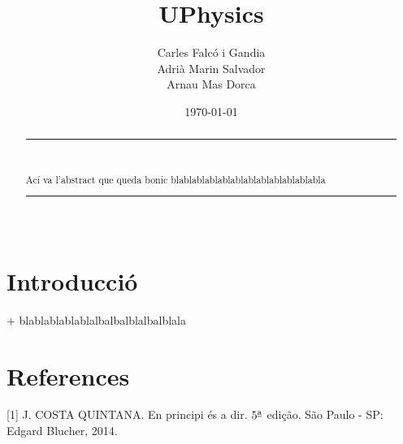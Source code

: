 \documentclass[aps,prl,reprint]{revtex4-1}
\begin{document}
	
	
	\title{UPhysics}
	
	\author{Carles Falcó i Gandia\\Adrià Marin Salvador\\Arnau Mas Dorca}
	
	\date{\today}
	
	\begin{abstract}
		
		\begin{center}
			
			\rule{15cm}{1pt} \\
			
		\end{center}
		
		Ací va l'abstract que queda bonic blablablablablablablablablablablabla
		\begin{center}
			
			\rule{15cm}{1pt} \\
			
		\end{center}
		
	\end{abstract}
	
	\maketitle
	\onecolumngrid\newpage\twocolumngrid
	\section{Introducció}
	+ blablablablablalbalbalblalbalblala
	\section{References}
	[1] J. COSTA QUINTANA. En principi és a dir. $5{\textsuperscript{\underline{a}}}$ edição. São Paulo - SP: Edgard Blucher, 2014. 
	
	
	
	
	
	
\end{document}
